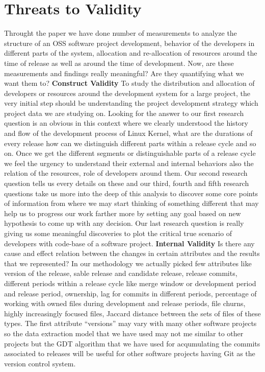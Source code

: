 \documentclass{acm_proc_article-sp}
\begin{document}
\section{Threats to Validity}
Throught the paper we have done number of measurements to analyze the structure of an OSS software project development, behavior of the developers in different parts of the system, allocation and re-allocation of resources around the time of release as well as around the time of development. Now, are these measurements and findings really meaningful? Are they quantifying what we want them to?\newline\newline
\textbf{Construct Validity} To study the distribution and allocation of developers or resources around the development system for a large project, the very initial step should be understanding the project development strategy which project data we are studying on. Looking for the answer to our first research question is an obvious in this context where we clearly understood the history and flow of the development process of Linux Kernel, what are the durations of every release how can we distinguish different parts within a release cycle and so on. Once we get the different segments or distinguishable parts of a release cycle we feel the urgency to understand their external and internal behaviors also the relation of the resources, role of developers around them. Our second research question tells us every details on these and our third, fourth and fifth research questions take us more into the deep of this analysis to discover some core points of information from where we may start thinking of something different that may help us to progress our work farther more by setting any goal based on new hypothesis to come up with any decision. Our last research question is really giving us some meaningful discoveries to plot the critical true scenario of developers with code-base of a software project.\newline\newline
\textbf{Internal Validity} Is there any cause and effect relation between the changes in certain attributes and the results that we represented? In our methodology we actually picked few attributes like version of the release, sable release and candidate release, release commits, different periods within a release cycle like merge window or development period and release period, ownership, lag for commits in different periods, percentage of working with owned files during development and release periods, file churns, highly increasingly focused files, Jaccard distance between the sets of files of these types. The first attribute ``versions'' may vary with many other software projects so the data extraction model that we have used may not me similar to other projects but the GDT algorithm that we have used for acqumulating the commits associated to releases will be useful for other software projects having Git as the version control system.\newline\newline
\end{document}
